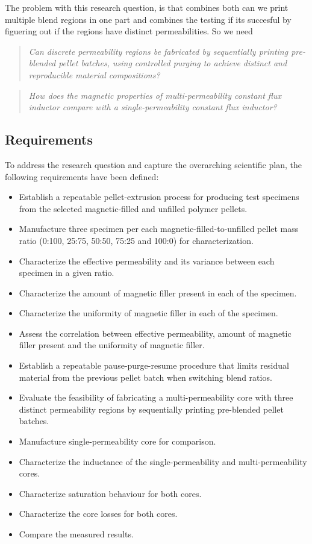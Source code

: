 The problem with this research question, is that combines both can we print multiple blend regions in one part and combines the testing if its succesful by figuering out if the regions have distinct permeabilities. So we need 

\begin{quote}
  \textit{Can discrete permeability regions be fabricated by sequentially printing pre-blended pellet batches, using controlled purging to achieve distinct and reproducible material compositions?} 
\end{quote}

\begin{quote}
  \textit{How does the magnetic properties of multi-permeability constant flux inductor compare with a single-permeability constant flux inductor?} 
\end{quote}

\subsection{Requirements}
To address the research question and capture the overarching scientific plan, the following requirements have been defined:
\begin{itemize}
  \item Establish a repeatable pellet-extrusion process for producing test specimens from the selected magnetic-filled and unfilled polymer pellets.
  \item Manufacture three specimen per each magnetic-filled-to-unfilled pellet mass ratio (0:100, 25:75, 50:50, 75:25 and 100:0) for characterization.
  \item Characterize the effective permeability and its variance between each specimen in a given ratio. 
  \item Characterize the amount of magnetic filler present in each of the specimen.
  \item Characterize the uniformity of magnetic filler in each of the specimen. 
  \item Assess the correlation between effective permeability, amount of magnetic filler present and the uniformity of magnetic filler. 
  \item Establish a repeatable pause-purge-resume procedure that limits residual material from the previous pellet batch when switching blend ratios.
  \item Evaluate the feasibility of fabricating a multi-permeability core with three distinct permeability regions by sequentially printing pre-blended pellet batches.
  \item Manufacture single-permeability core for comparison.
  \item Characterize the inductance of the single-permeability and multi-permeability cores.
  \item Characterize saturation behaviour for both cores.
  \item Characterize the core losses for both cores.
  \item Compare the measured results.
\end{itemize}

